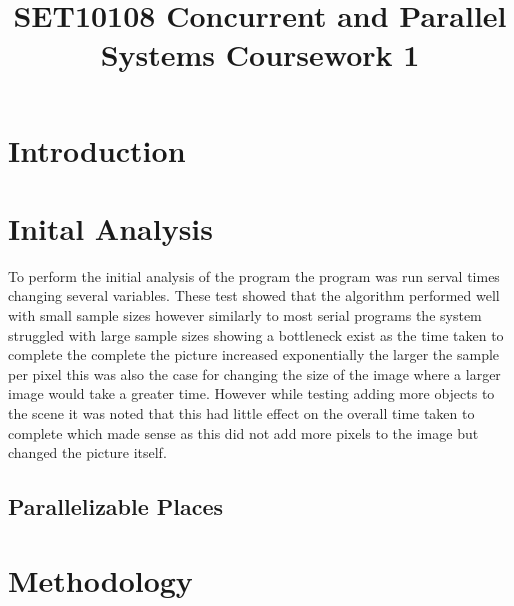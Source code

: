 \documentclass[journal,transmag]{IEEEtran}
\begin{document}
\title{SET10108 Concurrent and Parallel Systems \linebreak Coursework 1}



\maketitle

\section{Introduction}
 

\section{Inital Analysis}
To perform the initial analysis of the program the program was run serval times changing several variables. These test showed that the algorithm performed well with small sample sizes however similarly to most serial programs the system struggled with large sample sizes showing a bottleneck exist as the time taken to complete the complete the picture increased exponentially the larger the sample per pixel this was also the case for changing the size of the image where a larger image would take a greater time. However while testing adding more objects to the scene it was noted that this had little effect on the overall time taken to complete which made sense as this did not add more pixels to the image but changed the picture itself.
	\subsection{Parallelizable Places}

	
\section{Methodology}
\end{document}
